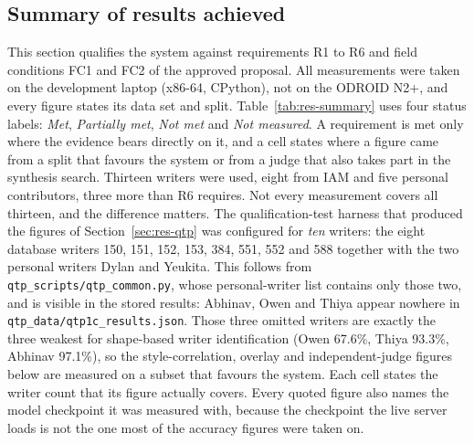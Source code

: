 \label{sec:results}
\providecommand{\nym}{{\color{red}\bfseries [NOT YET MEASURED]}}
\providecommand{\xh}{x_{\mathrm{h}}}
\providecommand{\NoHumanPanel}{%
\textbf{Not carried out.} The blind human panel of eight raters, the Fleiss kappa
agreement measure and the live demonstration of the proposal were not executed,
so the third and fourth sub-tests of this qualification test remain
\nym{}. The feature-correlation and overlay sub-tests above measure geometric and
pixel-domain distances between the synthesis and the writers' real hands. No
measurement of human acceptance of the output was taken, and the proposal's
demonstration asks for one; Section~\ref{sec:discussion} treats what that
leaves unproven.}

\subsection{Summary of results achieved} %
\label{sec:res-summary}

This section qualifies the system against requirements R1 to R6 and field conditions FC1 and FC2 of the approved proposal.
All measurements were taken on the development laptop (x86-64, CPython), not on the ODROID N2+, and every figure states its data set and split.
Table~\ref{tab:res-summary} uses four status labels: \emph{Met}, \emph{Partially met}, \emph{Not met} and \emph{Not measured}.
A requirement is met only where the evidence bears directly on it, and a cell states where a figure came from a split that favours the system or from a judge that also takes part in the synthesis search.
Thirteen writers were used, eight from IAM and five personal contributors, three more than R6 requires.
Not every measurement covers all thirteen, and the difference matters.
The qualification-test harness that produced the figures of Section~\ref{sec:res-qtp} was configured for \emph{ten} writers: the eight database writers 150, 151, 152, 153, 384, 551, 552 and 588 together with the two personal writers Dylan and Yeukita.
This follows from \texttt{qtp\_scripts/qtp\_common.py}, whose personal-writer list contains only those two, and is visible in the stored results: Abhinav, Owen and Thiya appear nowhere in \texttt{qtp\_data/qtp1c\_results.json}.
Those three omitted writers are exactly the three weakest for shape-based writer identification (Owen 67.6\%, Thiya 93.3\%, Abhinav 97.1\%), so the style-correlation, overlay and independent-judge figures below are measured on a subset that favours the system.
Each cell states the writer count that its figure actually covers.
Every quoted figure also names the model checkpoint it was measured with, because the checkpoint the live server loads is not the one most of the accuracy figures were taken on.

